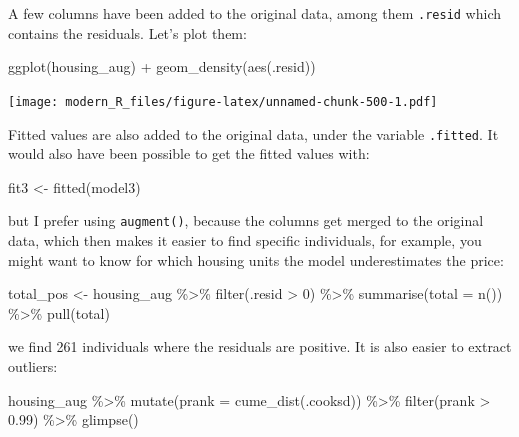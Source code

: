 \documentclass[
]{article}
\newenvironment{Shaded}{\begin{snugshade}}{\end{snugshade}}
\newcommand{\AttributeTok}[1]{\textcolor[rgb]{0.77,0.63,0.00}{#1}}
\newcommand{\DecValTok}[1]{\textcolor[rgb]{0.00,0.00,0.81}{#1}}
\newcommand{\FloatTok}[1]{\textcolor[rgb]{0.00,0.00,0.81}{#1}}
\newcommand{\FunctionTok}[1]{\textcolor[rgb]{0.00,0.00,0.00}{#1}}
\newcommand{\NormalTok}[1]{#1}
\newcommand{\OtherTok}[1]{\textcolor[rgb]{0.56,0.35,0.01}{#1}}
\newcommand{\SpecialCharTok}[1]{\textcolor[rgb]{0.00,0.00,0.00}{#1}}
\begin{document}
A few columns have been added to the original data, among them \texttt{.resid} which contains the
residuals. Let's plot them:

\begin{Shaded}
\begin{Highlighting}[]
\FunctionTok{ggplot}\NormalTok{(housing\_aug) }\SpecialCharTok{+}
  \FunctionTok{geom\_density}\NormalTok{(}\FunctionTok{aes}\NormalTok{(.resid))}
\end{Highlighting}
\end{Shaded}

\texttt{[image: modern\_R\_files/figure-latex/unnamed-chunk-500-1.pdf]}

Fitted values are also added to the original data, under the variable \texttt{.fitted}. It would also have
been possible to get the fitted values with:

\begin{Shaded}
\begin{Highlighting}[]
\NormalTok{fit3 }\OtherTok{\textless{}{-}} \FunctionTok{fitted}\NormalTok{(model3)}
\end{Highlighting}
\end{Shaded}

but I prefer using \texttt{augment()}, because the columns get merged to the original data, which then
makes it easier to find specific individuals, for example, you might want to know for which housing
units the model underestimates the price:

\begin{Shaded}
\begin{Highlighting}[]
\NormalTok{total\_pos }\OtherTok{\textless{}{-}}\NormalTok{ housing\_aug }\SpecialCharTok{\%\textgreater{}\%}
  \FunctionTok{filter}\NormalTok{(.resid }\SpecialCharTok{\textgreater{}} \DecValTok{0}\NormalTok{) }\SpecialCharTok{\%\textgreater{}\%}
  \FunctionTok{summarise}\NormalTok{(}\AttributeTok{total =} \FunctionTok{n}\NormalTok{()) }\SpecialCharTok{\%\textgreater{}\%}
  \FunctionTok{pull}\NormalTok{(total)}
\end{Highlighting}
\end{Shaded}

we find 261 individuals where the residuals are positive. It is also easier to
extract outliers:

\begin{Shaded}
\begin{Highlighting}[]
\NormalTok{housing\_aug }\SpecialCharTok{\%\textgreater{}\%}
  \FunctionTok{mutate}\NormalTok{(}\AttributeTok{prank =} \FunctionTok{cume\_dist}\NormalTok{(.cooksd)) }\SpecialCharTok{\%\textgreater{}\%}
  \FunctionTok{filter}\NormalTok{(prank }\SpecialCharTok{\textgreater{}} \FloatTok{0.99}\NormalTok{) }\SpecialCharTok{\%\textgreater{}\%}
  \FunctionTok{glimpse}\NormalTok{()}
\end{Highlighting}
\end{Shaded}
\end{document}
